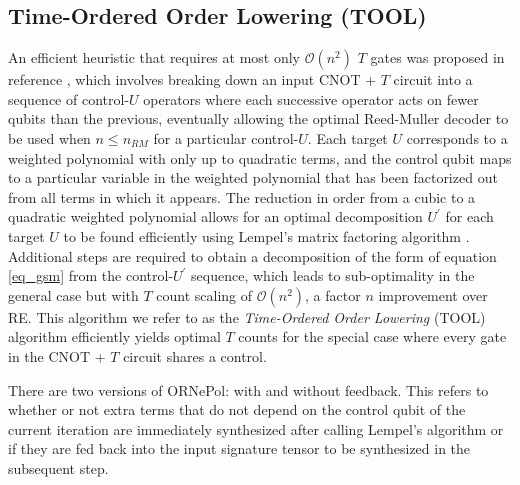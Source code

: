 \documentclass[notitlepage]{article}
\theoremstyle{definition}
\theoremstyle{problem}
\theoremstyle{lemma}
\begin{document}
\subsection{Time-Ordered Order Lowering (TOOL)}%
An efficient heuristic that requires at most only $\mathcal{O}(n^2)$ $T$ gates was proposed in reference \cite{4_Campbell_2017}, which involves breaking down an input CNOT + $T$ circuit into a sequence of control-$U$ operators where each successive operator acts on fewer qubits than the previous, eventually allowing the optimal Reed-Muller decoder to be used when $n\leq n_{RM}$ for a particular control-$U$. Each target $U$ corresponds to a weighted polynomial with only up to quadratic terms, and the control qubit maps to a particular variable in the weighted polynomial that has been factorized out from all terms in which it appears. The reduction in order from a cubic to a quadratic weighted polynomial allows for an optimal decomposition $U^\prime$ for each target $U$ to be found efficiently using Lempel's matrix factoring algorithm \cite{8_Lempel_1975}. Additional steps are required to obtain a decomposition of the form of equation \ref{eq_gsm} from the control-$U^\prime$ sequence, which leads to sub-optimality in the general case but with $T$ count scaling of $\mathcal{O}(n^2)$, a factor $n$ improvement over RE. This algorithm we refer to as the \emph{Time-Ordered Order Lowering} (TOOL) algorithm efficiently yields optimal $T$ counts for the special case where every gate in the CNOT + $T$ circuit shares a control.

There are two versions of ORNePol: with and without feedback. This refers to whether or not extra terms that do not depend on the control qubit of the current iteration are immediately synthesized after calling Lempel's algorithm or if they are fed back into the input signature tensor to be synthesized in the subsequent step.
\end{document}
